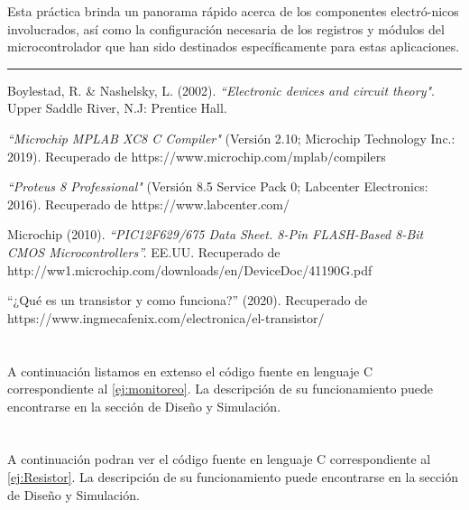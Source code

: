 \documentclass[a4paper]{article}
\let\originalappendix\appendix
\renewcommand{\appendix}{%
    \newpage\originalappendix\pagenumbering{gobble}%
    \renewcommand\thesection{Anexo \Alph{section}}
    \setcounter{secnumdepth}{1}
}
\begin{document}
Esta práctica brinda un panorama rápido acerca de los componentes
electró-nicos involucrados, así como la configuración necesaria de 
los registros y módulos del microcontrolador que han sido destinados
específicamente para estas aplicaciones.

\noindent\rule{\textwidth}{1pt}

\begin{thebibliography}{9}

Boylestad, R. \& Nashelsky, L. (2002). 
\textit{``Electronic devices and circuit theory"}.
Upper Saddle River, N.J: Prentice Hall.

\textit{``Microchip MPLAB XC8 C Compiler"}
(Versión 2.10; Microchip Technology Inc.: 2019).
Recuperado de https://www.microchip.com/mplab/compilers

\textit{``Proteus 8 Professional"} 
(Versión 8.5 Service Pack 0; Labcenter Electronics: 2016).
Recuperado de https://www.labcenter.com/

Microchip (2010).
\textit{``PIC12F629/675 Data Sheet. 8-Pin FLASH-Based 8-Bit CMOS 
Microcontrollers''.}
EE.UU. Recuperado de 
http://ww1.microchip.com/downloads/en/DeviceDoc/41190G.pdf

``¿Qué es un transistor y como funciona?'' (2020).
Recuperado de 
https://www.ingmecafenix.com/electronica/el-transistor/

\end{thebibliography}


\appendix

\section{}\label{ane:monitoreo}
A continuación listamos en extenso el código fuente en lenguaje C
correspondiente al \ref{ej:monitoreo}. La descripción de su 
funcionamiento puede encontrarse en la sección de Diseño y 
Simulación.



\newpage
\section{}\label{ane:Corriente alterna o considerable}
A continuación podran ver el  código fuente en lenguaje C correspondiente
al \ref{ej:Resistor}. La descripción de su funcionamiento puede encontrarse en
la sección de Diseño y Simulación.


\end{document}
